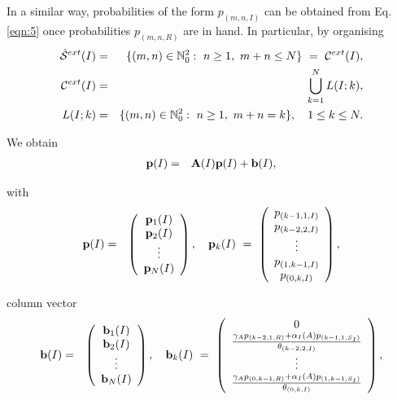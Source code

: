 \documentclass[10pt,A4paper]{article}
\begin{document}
\par In a similar way, probabilities of the form $p_{(m,n,I)}$ can be obtained from Eq. \eqref{eqn:5} once probabilities $p_{(m,n,R)}$ are in hand.
In particular, by organising
\begin{eqnarray*}
 {\cal \tilde S}^{ext}(I) &=& \{(m,n)\in\mathbb{N}_0^2:\ n\geq1,\ m+n\leq N\} \ = \ {\cal C}^{ext}(I),\\
 {\cal C}^{ext}(I) &=& \bigcup\limits_{k=1}^{N} L(I;k),\\
 L(I;k) &=& \{(m,n)\in\mathbb{N}_0^2:\ n\geq1,\ m+n=k\},\quad 1\leq k\leq N.
\end{eqnarray*}

\par\noindent We obtain
\begin{eqnarray}\label{eqn:10}
 {\bf p}(I) &=& {\bf A}(I){\bf p}(I)+{\bf b}(I),
\end{eqnarray}
\par\noindent with
\begin{eqnarray*}
 {\bf p}(I) &=& \left(\begin{array}{c}
                         {\bf p}_1(I)\\
{\bf p}_2(I)\\
\vdots\\
{\bf p}_{N}(I)
\end{array}\right),\quad {\bf p}_k(I) \ = \ \left(\begin{array}{c}
p_{(k-1,1,I)}\\
p_{(k-2,2,I)}\\
\vdots\\
p_{(1,k-1,I)}\\
p_{(0,k,I)}
\end{array}\right),
\end{eqnarray*}
\par\noindent column vector
\begin{eqnarray*}
{\bf b}(I) &=& \left(\begin{array}{c}
                          {\bf b}_1(I)\\
{\bf b}_2(I)\\
\vdots\\
{\bf b}_{N}(I)
                         \end{array}\right),\quad
{\bf b}_k(I) \ = \ \left(\begin{array}{c}
               0\\
\frac{\gamma_A p_{(k-2,1,R)}+\alpha_I(A) p_{(k-1,1,S_I)}}{\theta_{(k-2,2,I)}}\\
\vdots\\
\frac{\gamma_Ap_{(0,k-1,R)}+\alpha_I(A)p_{(1,k-1,S_I)}}{\theta_{(0,k,I)}}
                         \end{array}\right),
\end{eqnarray*}
\end{document}
